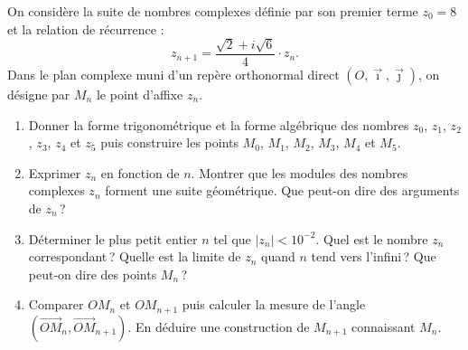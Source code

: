 %
\begin{exo}
      On consid\`ere la suite de nombres complexes d\'efinie par son premier terme $z_0=8$ et la relation de r\'ecurrence :
            \[
                  z_{n+1} = \frac{\sqrt{2}+i\sqrt{6}}{4} \cdot z_n      .
            \]
      Dans le plan complexe muni d'un rep\`ere orthonormal direct $(O,\vec{\imath},\vec{\jmath})$,
      on d\'esigne par $M_n$ le point d'affixe $z_n$.
      \begin{enumerate}
            \item Donner la forme trigonom\'etrique et la forme alg\'ebrique des nombres       
                  $z_0$, $z_1$, $z_2$, $z_3$, $z_4$ et $z_5$
                  puis construire les points 
                  $M_0$, $M_1$, $M_2$, $M_3$, $M_4$ et $M_5$.
            \item Exprimer $z_n$ en fonction de $n$.
                  Montrer que les modules des nombres complexes $z_n$ forment une suite g\'eom\'etrique.
                  Que peut-on dire des arguments de $z_n$\,?
            \item D\'eterminer le plus petit entier $n$ tel que $|z_n| < 10^{-2}$.
                  Quel est le nombre $z_n$ correspondant\,?
                  Quelle est la limite de $z_n$ quand $n$ tend vers l'infini\,?
                  Que peut-on dire des points $M_n$\,?
            \item Comparer $OM_n$ et $OM_{n+1}$ puis calculer la mesure de l'angle 
                  $ \left( \overrightarrow{OM}_n,\overrightarrow{OM}_{n+1} \right)$.
                  En d\'eduire une construction de $M_{n+1}$ connaissant $M_n$.
      \end{enumerate}
\end{exo}
%
